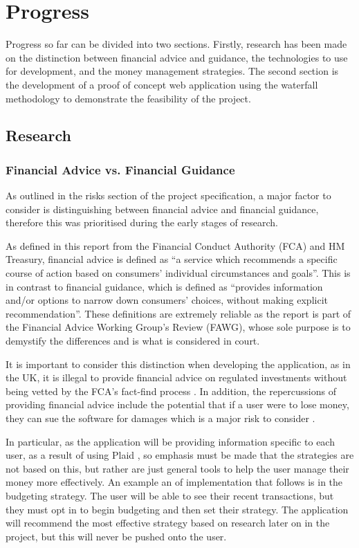 \section{Progress} \label{sec:progress}
Progress so far can be divided into two sections. Firstly, research has been made on the distinction between financial advice and guidance, the technologies to use for development, and the money management strategies. The second section is the development of a proof of concept web application using the waterfall methodology to demonstrate the feasibility of the project.

\subsection{Research}
\subsubsection{Financial Advice vs. Financial Guidance}
As outlined in the risks section of the project specification, a major factor to consider is distinguishing between financial advice and financial guidance, therefore this was prioritised during the early stages of research.

As defined in this report \cite{FCAReport} from the Financial Conduct Authority (FCA) and HM Treasury, financial advice is defined as ``a service which recommends a specific course of action based on consumers' individual circumstances and goals''. This is in contrast to financial guidance, which is defined as ``provides information and/or options to narrow down consumers' choices, without making explicit recommendation''. These definitions are extremely reliable as the report is part of the Financial Advice Working Group's Review (FAWG), whose sole purpose is to demystify the differences and is what is considered in court.

It is important to consider this distinction when developing the application, as in the UK, it is illegal to provide financial advice on regulated investments without being vetted by the FCA's fact-find process \cite{FinancialAdviceLegalities}. In addition, the repercussions of providing financial advice include the potential that if a user were to lose money, they can sue the software for damages which is a major risk to consider \cite{SueBroker}. 

In particular, as the application will be providing information specific to each user, as a result of using Plaid \cite{Plaid}, so emphasis must be made that the strategies are not based on this, but rather are just general tools to help the user manage their money more effectively. An example an of implementation that follows is in the budgeting strategy. The user will be able to see their recent transactions, but they must opt in to begin budgeting and then set their strategy. The application will recommend the most effective strategy based on research later on in the project, but this will never be pushed onto the user.


